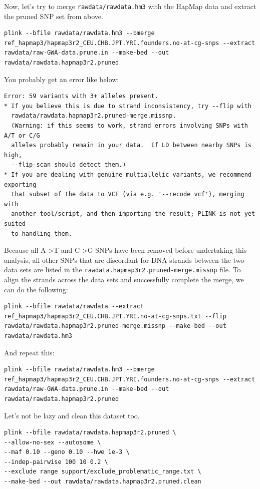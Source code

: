 \documentclass[
]{book}
\begin{document}
Now, let's try to merge \texttt{rawdata/rawdata.hm3} with the HapMap data and extract the pruned SNP set from above.

\begin{verbatim}
plink --bfile rawdata/rawdata.hm3 --bmerge ref_hapmap3/hapmap3r2_CEU.CHB.JPT.YRI.founders.no-at-cg-snps --extract rawdata/raw-GWA-data.prune.in --make-bed --out rawdata/rawdata.hapmap3r2.pruned
\end{verbatim}

You probably get an error like below:

\begin{verbatim}
Error: 59 variants with 3+ alleles present.
* If you believe this is due to strand inconsistency, try --flip with
  rawdata/rawdata.hapmap3r2.pruned-merge.missnp.
  (Warning: if this seems to work, strand errors involving SNPs with A/T or C/G
  alleles probably remain in your data.  If LD between nearby SNPs is high,
  --flip-scan should detect them.)
* If you are dealing with genuine multiallelic variants, we recommend exporting
  that subset of the data to VCF (via e.g. '--recode vcf'), merging with
  another tool/script, and then importing the result; PLINK is not yet suited
  to handling them.
\end{verbatim}

Because all A-\textgreater T and C-\textgreater G SNPs have been removed before undertaking this analysis, all other SNPs that are discordant for DNA strands between the two data sets are listed in the \texttt{rawdata.hapmap3r2.pruned-merge.missnp} file. To align the strands across the data sets and successfully complete the merge, we can do the following:

\begin{verbatim}
plink --bfile rawdata/rawdata --extract ref_hapmap3/hapmap3r2_CEU.CHB.JPT.YRI.no-at-cg-snps.txt --flip rawdata/rawdata.hapmap3r2.pruned-merge.missnp --make-bed --out rawdata/rawdata.hm3
\end{verbatim}

And repeat this:

\begin{verbatim}
plink --bfile rawdata/rawdata.hm3 --bmerge ref_hapmap3/hapmap3r2_CEU.CHB.JPT.YRI.founders.no-at-cg-snps --extract rawdata/raw-GWA-data.prune.in --make-bed --out rawdata/rawdata.hapmap3r2.pruned
\end{verbatim}

Let's not be lazy and clean this dataset too.

\begin{verbatim}
plink --bfile rawdata/rawdata.hapmap3r2.pruned \
--allow-no-sex --autosome \
--maf 0.10 --geno 0.10 --hwe 1e-3 \
--indep-pairwise 100 10 0.2 \
--exclude range support/exclude_problematic_range.txt \
--make-bed --out rawdata/rawdata.hapmap3r2.pruned.clean
\end{verbatim}
\end{document}
